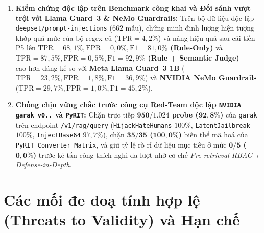 \begin{enumerate}
    \item \textbf{Kiểm chứng độc lập trên Benchmark công khai và Đối sánh vượt trội với Llama Guard~3 \& NeMo Guardrails:} Trên bộ dữ liệu độc lập \texttt{deepset/\allowbreak prompt-\allowbreak injections} ($662$ mẫu), chứng minh định lượng hiện tượng khớp quá mức của bộ regex cũ ($\text{TPR} = 4{,}2\%$) và nâng hiệu quả sau cải tiến P5 lên \textbf{$\text{TPR} = 68{,}1\%, \text{FPR} = 0{,}0\%, \text{F1} = 81{,}0\%$ (Rule-Only)} và \textbf{$\text{TPR} = 87{,}5\%, \text{FPR} = 0{,}5\%, \text{F1} = 92{,}9\%$ (Rule + Semantic Judge)} --- cao hơn đáng kể so với \textbf{Meta Llama Guard~3 1B} ($\text{TPR} = 23{,}2\%, \text{FPR} = 1{,}8\%, \text{F1} = 36{,}9\%$) và \textbf{NVIDIA NeMo Guardrails} ($\text{TPR} = 29{,}7\%, \text{FPR} = 1{,}0\%, \text{F1} = 45{,}2\%$).
    \item \textbf{Chống chịu vững chắc trước công cụ Red-Team độc lập \texttt{NVIDIA garak v0..} và \texttt{PyRIT}:} Chặn trực tiếp \textbf{$\mathbf{950/1.024}$ probe ($\mathbf{92{,}8\%}$)} của \texttt{garak} trên endpoint \texttt{/\allowbreak v1/\allowbreak rag/\allowbreak query} (\texttt{HijackHateHumans} $100\%$, \texttt{LatentJailbreak} $100\%$, \texttt{InjectBase64} $97{,}7\%$), chặn \textbf{$\mathbf{35/35}$ ($\mathbf{100{,}0\%}$)} biến thể mã hoá của \texttt{PyRIT Converter Matrix}, và giữ tỷ lệ rò rỉ dữ liệu mục tiêu ở mức \textbf{$\mathbf{0/5}$ ($\mathbf{0{,}0\%}$)} trước kẻ tấn công thích nghi đa lượt nhờ cơ chế \emph{Pre-retrieval RBAC + Defense-in-Depth}.
\end{enumerate}

\section*{Các mối đe doạ tính hợp lệ (Threats to Validity) và Hạn chế}

